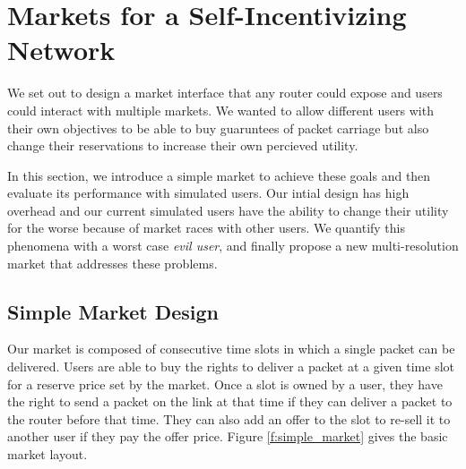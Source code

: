 \section{Markets for a Self-Incentivizing Network}
\label{sec:designs}
We set out to design a market interface that any router could expose and users could interact with multiple markets.
We wanted to allow different users with their own objectives to be able to buy guaruntees of packet carriage but also change their reservations to increase their own percieved utility.

In this section, we introduce a simple market to achieve these goals and then evaluate its performance with simulated users.
Our intial design has high overhead and our current simulated users have the ability to change their utility for the worse because of market races with other users. We quantify this phenomena with a worst case \emph{evil user}, and finally propose a new multi-resolution market that addresses these problems.

%
%
%
%

\subsection{Simple Market Design}
Our market is composed of consecutive time slots in which a single packet can be delivered. Users are able to buy the rights to deliver a packet at a given time slot for a reserve price set by the market. Once a slot is owned by a user, they have the right to send a packet on the link at that time if they can deliver a packet to the router before that time. They can also add an offer to the slot to re-sell it to another user if they pay the offer price. Figure \ref{f:simple_market} gives the basic market layout.

